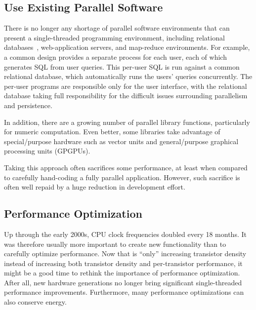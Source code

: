 \subsection{Use Existing Parallel Software}
\label{sec:intro:Use Existing Parallel Software}

There is no longer any shortage of parallel software environments that
can present a single-threaded programming environment,
including relational
databases~\cite{Date82},
web-application servers, and map-reduce environments.
For example, a common design provides a separate process for each
user, each of which generates SQL from user queries.
This per-user SQL is run against a common relational database, which
automatically runs the users' queries concurrently.
The per-user programs are responsible only for the user interface,
with the relational database taking full responsibility for the
difficult issues surrounding parallelism and persistence.

In addition, there are a growing number of parallel library functions,
particularly for numeric computation.
Even better, some libraries take advantage of special\-/purpose
hardware such as vector units and general\-/purpose graphical processing
units (GPGPUs).

Taking this approach often sacrifices some performance, at least when
compared to carefully hand-coding a fully parallel application.
However, such sacrifice is often well repaid by a huge reduction in
development effort.

\QuickQuizEnd

\subsection{Performance Optimization}
\label{sec:intro:Performance Optimization}

Up through the early 2000s, CPU clock frequencies doubled every 18 months.
It was therefore usually more important to create new functionality than to
carefully optimize performance.
Now that  is ``only'' increasing transistor density instead
of increasing both transistor density and per-transistor performance,
it might be a good time to rethink the importance of performance
optimization.
After all, new hardware generations no longer bring significant
single-threaded performance improvements.
Furthermore, many performance optimizations can also conserve energy.

